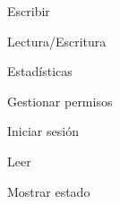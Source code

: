 \begin{figure}[!h]
\centering
\escribir
\caption{Escribir}
\end{figure}
\newpage

\begin{figure}[!h]
\centering
\lecturaEscritura
\caption{Lectura/Escritura}
\end{figure}
\newpage

\begin{figure}[!h]
\centering
\estadisticas
\caption{Estadísticas}
\end{figure}
\newpage

\begin{figure}[!h]
\centering
\gestionarPermisos
\caption{Gestionar permisos}
\end{figure}
\newpage

\begin{figure}[!h]
\centering
\iniciarSesion
\caption{Iniciar sesión}
\end{figure}
\newpage

\begin{figure}[!h]
\centering
\leer
\caption{Leer}
\end{figure}
\newpage

\begin{figure}[!h]
\centering
\mostrarEstado
\caption{Mostrar estado}
\end{figure}
\newpage

